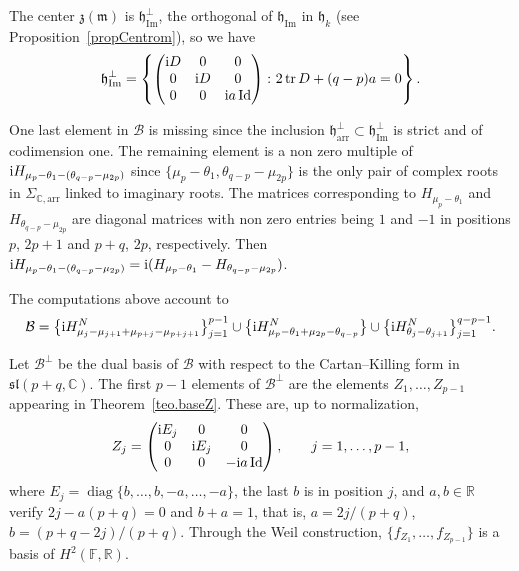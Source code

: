 \documentclass[pdftex]{sigma}
\numberwithin{equation}{section}
\newcommand{\func}[1]{\operatorname{#1}}
\begin{document}
The center $\mathfrak{z }(\mathfrak{m })$ is $\mathfrak{h}_{\func{Im}}^{\bot}$, the orthogonal of $\mathfrak{h}_{\func{Im}}$ in $\mathfrak{h}_{k}$ (see Proposition~\ref{propCentrom}), so we have
\begin{gather*}
\mathfrak{h}_{\func{Im}}^{\bot }=\left\{\left(
\begin{matrix}
{\rm i}D & 0 & 0 \\
0 & {\rm i}D & 0 \\
0 & 0 & {\rm i}a\, \mathrm{Id}
\end{matrix}
\right)\colon 2\operatorname{tr}D+(q-p) a=0 \right\}.
\end{gather*}

One last element in $\mathcal{B}$ is missing since the inclusion $\mathfrak{h}_{\mathrm{arr}}^{\bot }\subset \mathfrak{h}_{\func{Im}}^{\bot }$ is strict and of codimension one. The remaining element is a non zero multiple of ${\rm i}H_{\mu_p-\theta_1-(\theta_{q-p}-\mu_{2p})}$ since $\{\mu_p-\theta_1,\theta_{q-p}-\mu_{2p}\}$ is the only pair of complex roots in $\Sigma_{\mathbb{C},\mathrm{arr}}$ linked to imaginary roots. The matrices corresponding to $H_{\mu_p-\theta_1}$ and $H_{\theta_{q-p}-\mu_{2p}}$ are diagonal matrices with non zero entries being $1$ and $-1$ in positions $p$, $2p+1$ and $p+q$, $2p$, respectively. Then ${\rm i}H_{\mu_p-\theta_1-(\theta_{q-p}-\mu_{2p})}={\rm i}(H_{\mu_p-\theta_1}-H_{\theta_{q-p}-\mu_{2p}})$.

The computations above account to
\begin{gather*}
\mathcal{B}= \big\{ {\rm i}H_{\mu_{j}-\mu _{j+1}+\mu _{p+j}-\mu _{p+j+1}}^N\big\}_{j=1}^{p-1} \cup\big\{{\rm i}H_{\mu_p-\theta_1+\mu_{2p}-\theta_{q-p}}^N\big\} \cup\big\{{\rm i}H_{\theta_j-\theta_{j+1}}^N\big\}_{j=1}^{q-p-1}.
\end{gather*}

Let $\mathcal{B}^{\bot }$ be the dual basis of $\mathcal{B}$ with respect to the Cartan--Killing form in $\mathfrak{sl}(p+q,\mathbb{C})$. The first $p-1$ elements of $\mathcal{B}^{\bot }$ are the elements $Z_{1},\ldots,Z_{p-1}$ appearing in Theorem~\ref{teo.baseZ}. These are, up to normalization,
\begin{gather*}
Z_{j}=\left(
\begin{matrix}
{\rm i}E_{j} & 0 & 0 \\
0 & {\rm i}E_{j} & 0 \\
0 & 0 & -{\rm i}a\func{Id}
\end{matrix}
\right), \qquad j=1,\ldots,p-1,
\end{gather*}%
where $E_{j}=\operatorname{diag}\{b,\ldots,b,-a,\ldots,-a\}$, the last $b$ is in position $j$, and $a,b\in \mathbb{R}$ verify $2j-a(p+q) =0$ and $b+a=1$, that is, $a=2j/(p+q)$, $b=(p+q-2j)/(p+q)$. Through the Weil construction, $\{f_{Z_{1}},\ldots,f_{Z_{p-1}}\}$ is a basis of $H^{2}(\mathbb{F},\mathbb{R})$.
\end{document}
